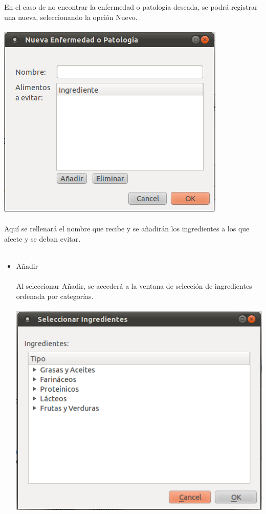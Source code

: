 \documentclass[12pt, spanish]{article}
\begin{document}
\begin{enumerate}
\begin{enumerate}
\begin{enumerate}
\begin{enumerate}
En el caso de no encontrar la enfermedad o patología deseada, se podrá registrar una nueva, seleccionando la opción Nuevo.\\\\
\includegraphics[scale=0.5]{Image/enfermedad-nueva.png}\\\\
Aquí se rellenará el nombre que recibe y se añadirán los ingredientes a los que afecte y se deban evitar.\\\\
\begin{itemize}
\item Añadir\\\\
Al seleccionar Añadir, se accederá a la ventana de selección de ingredientes ordenada por categorías.\\\\
\includegraphics[scale=0.5]{Image/enfermedad-nuevoingrd.png}\\\\

\end{itemize}
\end{enumerate}
\end{enumerate}
\end{enumerate}
\end{enumerate}
\end{document}
